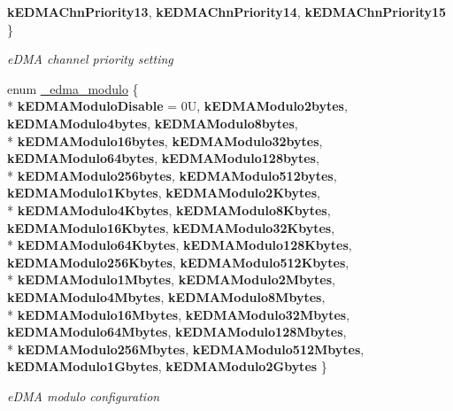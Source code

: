 \begin{DoxyCompactItemize}
{\bfseries k\+E\+D\+M\+A\+Chn\+Priority13}, 
{\bfseries k\+E\+D\+M\+A\+Chn\+Priority14}, 
{\bfseries k\+E\+D\+M\+A\+Chn\+Priority15}
 \}\hypertarget{group__edma__hal_ga483c1c022e62a1682cbb187ecdf3f5b0}{}\label{group__edma__hal_ga483c1c022e62a1682cbb187ecdf3f5b0}
\begin{DoxyCompactList}\small\item\em e\+D\+MA channel priority setting \end{DoxyCompactList}
\item 
enum \hyperlink{group__edma__hal_ga1a7d7ef429d6168ce7c9e43cee40d539}{\+\_\+edma\+\_\+modulo} \{ \\*
{\bfseries k\+E\+D\+M\+A\+Modulo\+Disable} = 0U, 
{\bfseries k\+E\+D\+M\+A\+Modulo2bytes}, 
{\bfseries k\+E\+D\+M\+A\+Modulo4bytes}, 
{\bfseries k\+E\+D\+M\+A\+Modulo8bytes}, 
\\*
{\bfseries k\+E\+D\+M\+A\+Modulo16bytes}, 
{\bfseries k\+E\+D\+M\+A\+Modulo32bytes}, 
{\bfseries k\+E\+D\+M\+A\+Modulo64bytes}, 
{\bfseries k\+E\+D\+M\+A\+Modulo128bytes}, 
\\*
{\bfseries k\+E\+D\+M\+A\+Modulo256bytes}, 
{\bfseries k\+E\+D\+M\+A\+Modulo512bytes}, 
{\bfseries k\+E\+D\+M\+A\+Modulo1\+Kbytes}, 
{\bfseries k\+E\+D\+M\+A\+Modulo2\+Kbytes}, 
\\*
{\bfseries k\+E\+D\+M\+A\+Modulo4\+Kbytes}, 
{\bfseries k\+E\+D\+M\+A\+Modulo8\+Kbytes}, 
{\bfseries k\+E\+D\+M\+A\+Modulo16\+Kbytes}, 
{\bfseries k\+E\+D\+M\+A\+Modulo32\+Kbytes}, 
\\*
{\bfseries k\+E\+D\+M\+A\+Modulo64\+Kbytes}, 
{\bfseries k\+E\+D\+M\+A\+Modulo128\+Kbytes}, 
{\bfseries k\+E\+D\+M\+A\+Modulo256\+Kbytes}, 
{\bfseries k\+E\+D\+M\+A\+Modulo512\+Kbytes}, 
\\*
{\bfseries k\+E\+D\+M\+A\+Modulo1\+Mbytes}, 
{\bfseries k\+E\+D\+M\+A\+Modulo2\+Mbytes}, 
{\bfseries k\+E\+D\+M\+A\+Modulo4\+Mbytes}, 
{\bfseries k\+E\+D\+M\+A\+Modulo8\+Mbytes}, 
\\*
{\bfseries k\+E\+D\+M\+A\+Modulo16\+Mbytes}, 
{\bfseries k\+E\+D\+M\+A\+Modulo32\+Mbytes}, 
{\bfseries k\+E\+D\+M\+A\+Modulo64\+Mbytes}, 
{\bfseries k\+E\+D\+M\+A\+Modulo128\+Mbytes}, 
\\*
{\bfseries k\+E\+D\+M\+A\+Modulo256\+Mbytes}, 
{\bfseries k\+E\+D\+M\+A\+Modulo512\+Mbytes}, 
{\bfseries k\+E\+D\+M\+A\+Modulo1\+Gbytes}, 
{\bfseries k\+E\+D\+M\+A\+Modulo2\+Gbytes}
 \}\hypertarget{group__edma__hal_ga1a7d7ef429d6168ce7c9e43cee40d539}{}\label{group__edma__hal_ga1a7d7ef429d6168ce7c9e43cee40d539}
\begin{DoxyCompactList}\small\item\em e\+D\+MA modulo configuration \end{DoxyCompactList}

\end{DoxyCompactItemize}
